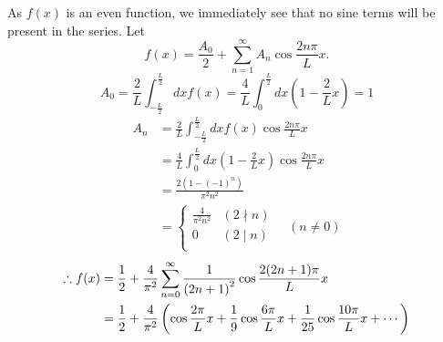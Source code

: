 \item

As $f(x)$ is an even function, we immediately see that no sine terms will be present in the series.
Let
\[
    f(x) = \frac{A_0}{2} + \sum_{n=1}^\infty A_n \cos \frac{2n\pi}{L}x.
\]
\[
    A_0
    = \frac{2}{L} \int_{-\frac{L}{2}}^{\frac{L}{2}} dx f(x)
    = \frac{4}{L} \int_0^{\frac{L}{2}} dx \left( 1 - \frac{2}{L} x \right)
    = 1
\]
\begin{align*}
    A_n
    &= \frac{2}{L} \int_{-\frac{L}{2}}^{\frac{L}{2}} dx f(x) \cos \frac{2n\pi}{L}x \\
    &= \frac{4}{L} \int_0^{\frac{L}{2}} dx \left( 1 - \frac{2}{L} x \right) \cos \frac{2n\pi}{L}x \\
    &= \frac{2\left( 1 - {(-1)}^n \right)}{\pi^2 n^2} \\
    &= \begin{cases}
        \frac{4}{\pi^2 n^2} & (2 \nmid n) \\
        0                   & (2 \mid  n) \\
    \end{cases}
    \quad (n \neq 0)
\end{align*}
\begin{align*}
    \therefore f(x)
    &= \frac{1}{2} + \frac{4}{\pi^2} \sum_{n=0}^\infty \frac{1}{{(2n+1)}^2} \cos \frac{2 (2n+1) \pi}{L} x \\
    &= \frac{1}{2} + \frac{4}{\pi^2} \left(
        \cos \frac{2\pi}{L} x
        + \frac{1}{9} \cos \frac{6\pi}{L} x
        + \frac{1}{25} \cos \frac{10\pi}{L} x
        + \cdots
    \right)
\end{align*}